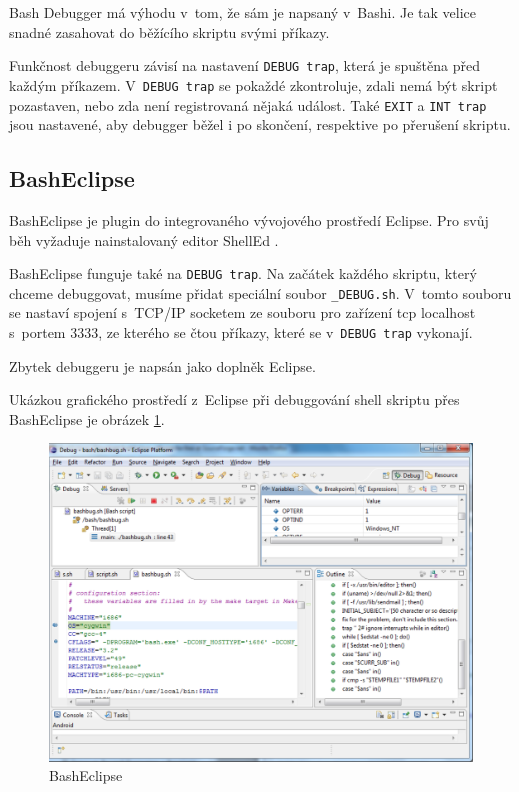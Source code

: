 \documentclass[thesis=M,czech]{FITthesis}[2012/06/26]
\begin{document}
Bash Debugger má výhodu v~tom, že sám je napsaný v~Bashi. Je tak velice snadné zasahovat do běžícího skriptu svými příkazy.

Funkčnost debuggeru závisí na nastavení \texttt{DEBUG trap}, která je spuštěna před každým příkazem. V~\texttt{DEBUG trap} se pokaždé zkontroluje, zdali nemá být skript pozastaven, nebo zda není registrovaná nějaká událost. Také \texttt{EXIT} a \texttt{INT trap} jsou nastavené, aby debugger běžel i po skončení, respektive po přerušení skriptu.





\subsection{BashEclipse}

BashEclipse \cite{basheclipse} je plugin do integrovaného vývojového prostředí Eclipse. Pro svůj běh vyžaduje nainstalovaný editor ShellEd \cite{shelled}.

BashEclipse funguje také na \texttt{DEBUG trap}. Na začátek každého skriptu, který chceme debuggovat, musíme přidat speciální soubor \texttt{\_DEBUG.sh}. V~tomto souboru se nastaví spojení s~TCP/IP socketem ze souboru pro zařízení tcp localhost s~portem 3333, ze kterého se čtou příkazy, které se v~\texttt{DEBUG trap} vykonají.

Zbytek debuggeru je napsán jako doplněk Eclipse.

Ukázkou grafického prostředí z~Eclipse při debuggování shell skriptu přes BashEclipse je obrázek \ref{fig:bash_eclipse}.

\begin{figure}
	\includegraphics[width=1.0\textwidth]{./images/bash_eclipse}
	\caption{BashEclipse \cite{basheclipse}}
	\label{fig:bash_eclipse}
\end{figure}
\end{document}
